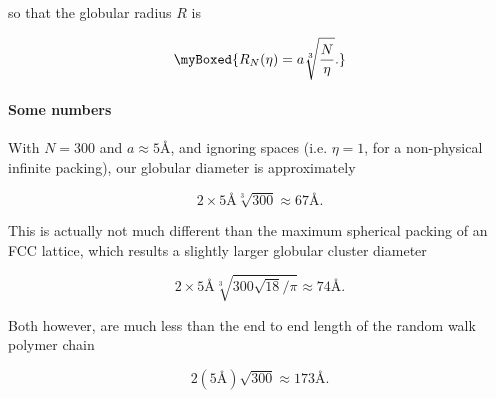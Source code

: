 {so that the globular radius $R$ is 

\begin{equation}\label{eqn:basicStatMechProblemSet3Problem2:180}
\myBoxed{
R_N(\eta) = a \sqrt[3]{\frac{N}{\eta}}.
}
\end{equation}

\paragraph{Some numbers}

With $N = 300$ and $a \approx 5 \text{\AA}$, and ignoring spaces (i.e. $\eta = 1$, for a non-physical infinite packing), our globular diameter is approximately

\begin{equation}\label{eqn:basicStatMechProblemSet3Problem2:240}
2 \times 5 \text{\AA} \sqrt[3]{300} \approx 67 \text{\AA}.
\end{equation}

This is actually not much different than the maximum spherical packing of an FCC lattice, which results a slightly larger globular cluster diameter

\begin{equation}\label{eqn:basicStatMechProblemSet3Problem2:260}
2 \times 5 \text{\AA} \sqrt[3]{300 \sqrt{18}/\pi} \approx 74 \text{\AA}.
\end{equation}

Both however, are much less than the end to end length of the random walk polymer chain

\begin{equation}\label{eqn:basicStatMechProblemSet3Problem2:220}
2 (5 \text{\AA}) \sqrt{300} \approx 173 \text{\AA}.
\end{equation}
}
